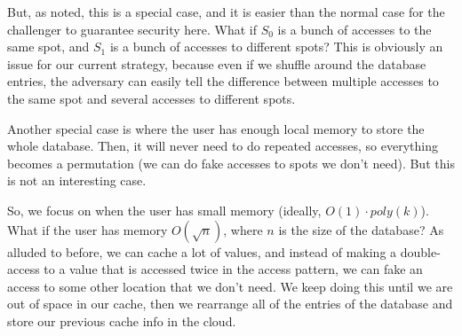 \documentclass[11pt]{article}
\begin{document}
But, as noted, this is a special case, and it is easier than the normal case for the challenger to guarantee security here.
What if \(S_0\) is a bunch of accesses to the same spot, and \(S_1\) is a bunch of accesses to different spots?
This is obviously an issue for our current strategy, because even if we shuffle around the database entries, the adversary can easily tell the difference between multiple accesses to the same spot and several accesses to different spots.\medskip

Another special case is where the user has enough local memory to store the whole database.
Then, it will never need to do repeated accesses, so everything becomes a permutation (we can do fake accesses to spots we don't need).
But this is not an interesting case.\medskip

So, we focus on when the user has small memory (ideally, \(O(1)\cdot poly(k)\)).
What if the user has memory \(O(\sqrt{n})\), where \(n\) is the size of the database?
As alluded to before, we can cache a lot of values, and instead of making a double-access to a value that  is accessed twice in the access pattern, we can fake an access to some other location that we don't need.
We keep doing this until we are out of space in our cache, then we rearrange all of the entries of the database and store our previous cache info in the cloud.
\end{document}

